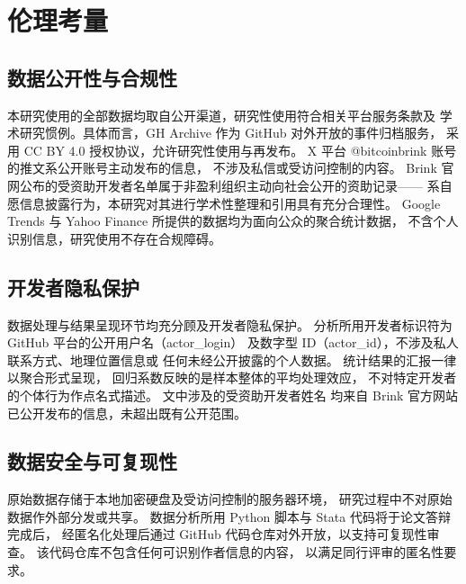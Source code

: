 \section{伦理考量}

\subsection{数据公开性与合规性}

本研究使用的全部数据均取自公开渠道，研究性使用符合相关平台服务条款及
学术研究惯例。具体而言，GH Archive 作为 GitHub 对外开放的事件归档服务，
采用 CC BY 4.0 授权协议，允许研究性使用与再发布。
X 平台 @bitcoinbrink 账号的推文系公开账号主动发布的信息，
不涉及私信或受访问控制的内容。
Brink 官网公布的受资助开发者名单属于非盈利组织主动向社会公开的资助记录——
系自愿信息披露行为，本研究对其进行学术性整理和引用具有充分合理性。
Google Trends 与 Yahoo Finance 所提供的数据均为面向公众的聚合统计数据，
不含个人识别信息，研究使用不存在合规障碍。

\subsection{开发者隐私保护}

数据处理与结果呈现环节均充分顾及开发者隐私保护。
分析所用开发者标识符为 GitHub 平台的公开用户名（actor\_login）
及数字型 ID（actor\_id），不涉及私人联系方式、地理位置信息或
任何未经公开披露的个人数据。
统计结果的汇报一律以聚合形式呈现，
回归系数反映的是样本整体的平均处理效应，
不对特定开发者的个体行为作点名式描述。
文中涉及的受资助开发者姓名
均来自 Brink 官方网站已公开发布的信息，未超出既有公开范围。

\subsection{数据安全与可复现性}

原始数据存储于本地加密硬盘及受访问控制的服务器环境，
研究过程中不对原始数据作外部分发或共享。
数据分析所用 Python 脚本与 Stata 代码将于论文答辩完成后，
经匿名化处理后通过 GitHub 代码仓库对外开放，以支持可复现性审查。
该代码仓库不包含任何可识别作者信息的内容，
以满足同行评审的匿名性要求。



